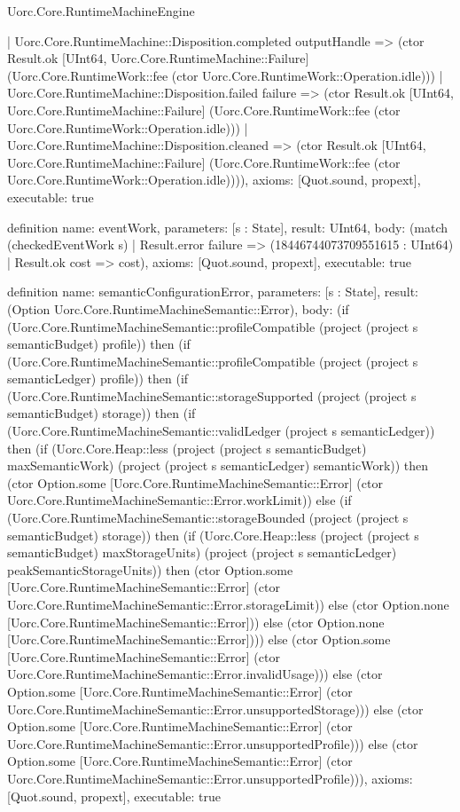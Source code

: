 \begin{lexlean}{Uorc.Core.RuntimeMachineEngine}
\begin{semanticmodule}
{    | Uorc.Core.RuntimeMachine::Disposition.completed outputHandle => (ctor Result.ok [UInt64, Uorc.Core.RuntimeMachine::Failure] (Uorc.Core.RuntimeWork::fee (ctor Uorc.Core.RuntimeWork::Operation.idle)))
    | Uorc.Core.RuntimeMachine::Disposition.failed failure => (ctor Result.ok [UInt64, Uorc.Core.RuntimeMachine::Failure] (Uorc.Core.RuntimeWork::fee (ctor Uorc.Core.RuntimeWork::Operation.idle)))
    | Uorc.Core.RuntimeMachine::Disposition.cleaned => (ctor Result.ok [UInt64, Uorc.Core.RuntimeMachine::Failure] (Uorc.Core.RuntimeWork::fee (ctor Uorc.Core.RuntimeWork::Operation.idle)))),
  axioms: [Quot.sound, propext],
  executable: true
}

definition{
  name: eventWork,
  parameters: [s : State],
  result: UInt64,
  body: (match (checkedEventWork s)
    | Result.error failure => (18446744073709551615 : UInt64)
    | Result.ok cost => cost),
  axioms: [Quot.sound, propext],
  executable: true
}

definition{
  name: semanticConfigurationError,
  parameters: [s : State],
  result: (Option Uorc.Core.RuntimeMachineSemantic::Error),
  body: (if (Uorc.Core.RuntimeMachineSemantic::profileCompatible (project (project s semanticBudget) profile)) then (if (Uorc.Core.RuntimeMachineSemantic::profileCompatible (project (project s semanticLedger) profile)) then (if (Uorc.Core.RuntimeMachineSemantic::storageSupported (project (project s semanticBudget) storage)) then (if (Uorc.Core.RuntimeMachineSemantic::validLedger (project s semanticLedger)) then (if (Uorc.Core.Heap::less (project (project s semanticBudget) maxSemanticWork) (project (project s semanticLedger) semanticWork)) then (ctor Option.some [Uorc.Core.RuntimeMachineSemantic::Error] (ctor Uorc.Core.RuntimeMachineSemantic::Error.workLimit)) else (if (Uorc.Core.RuntimeMachineSemantic::storageBounded (project (project s semanticBudget) storage)) then (if (Uorc.Core.Heap::less (project (project s semanticBudget) maxStorageUnits) (project (project s semanticLedger) peakSemanticStorageUnits)) then (ctor Option.some [Uorc.Core.RuntimeMachineSemantic::Error] (ctor Uorc.Core.RuntimeMachineSemantic::Error.storageLimit)) else (ctor Option.none [Uorc.Core.RuntimeMachineSemantic::Error])) else (ctor Option.none [Uorc.Core.RuntimeMachineSemantic::Error]))) else (ctor Option.some [Uorc.Core.RuntimeMachineSemantic::Error] (ctor Uorc.Core.RuntimeMachineSemantic::Error.invalidUsage))) else (ctor Option.some [Uorc.Core.RuntimeMachineSemantic::Error] (ctor Uorc.Core.RuntimeMachineSemantic::Error.unsupportedStorage))) else (ctor Option.some [Uorc.Core.RuntimeMachineSemantic::Error] (ctor Uorc.Core.RuntimeMachineSemantic::Error.unsupportedProfile))) else (ctor Option.some [Uorc.Core.RuntimeMachineSemantic::Error] (ctor Uorc.Core.RuntimeMachineSemantic::Error.unsupportedProfile))),
  axioms: [Quot.sound, propext],
  executable: true
}


\end{semanticmodule}
\end{lexlean}
